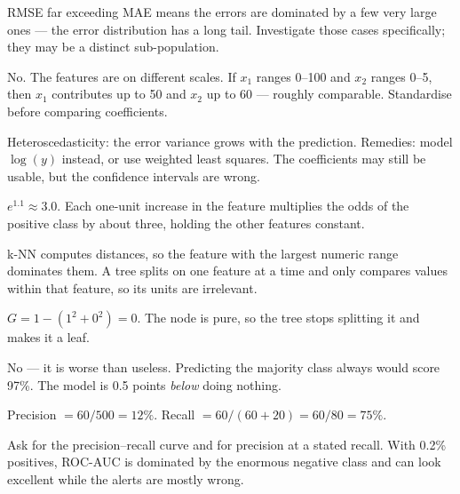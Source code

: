 \begin{ans}
  \item RMSE far exceeding MAE means the errors are dominated by a few very large
        ones --- the error distribution has a long tail. Investigate those cases
        specifically; they may be a distinct sub-population.
  \item No. The features are on different scales. If $x_1$ ranges 0--100 and $x_2$
        ranges 0--5, then $x_1$ contributes up to 50 and $x_2$ up to 60 --- roughly
        comparable. Standardise before comparing coefficients.
  \item Heteroscedasticity: the error variance grows with the prediction. Remedies:
        model $\log(y)$ instead, or use weighted least squares. The coefficients may
        still be usable, but the confidence intervals are wrong.
\end{ans}

\begin{ans}
  \item $e^{1.1} \approx 3.0$. Each one-unit increase in the feature multiplies the
        odds of the positive class by about three, holding the other features
        constant.
  \item k-NN computes distances, so the feature with the largest numeric range
        dominates them. A tree splits on one feature at a time and only compares
        values within that feature, so its units are irrelevant.
  \item $G = 1 - (1^2 + 0^2) = 0$. The node is pure, so the tree stops splitting it
        and makes it a leaf.
\end{ans}

\begin{ans}
  \item No --- it is worse than useless. Predicting the majority class always would
        score 97\%. The model is 0.5 points \emph{below} doing nothing.
  \item Precision $= 60/500 = 12\%$. Recall $= 60/(60+20) = 60/80 = 75\%$.
  \item Ask for the precision--recall curve and for precision at a stated recall.
        With 0.2\% positives, ROC-AUC is dominated by the enormous negative class
        and can look excellent while the alerts are mostly wrong.
\end{ans}

